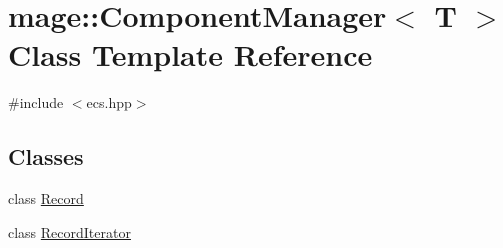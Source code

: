 \hypertarget{classmage_1_1_component_manager}{}\section{mage\+:\+:Component\+Manager$<$ T $>$ Class Template Reference}
\label{classmage_1_1_component_manager}


{\ttfamily \#include $<$ecs.\+hpp$>$}

\subsection*{Classes}
\begin{DoxyCompactItemize}
\item 
class \mbox{\hyperlink{classmage_1_1_component_manager_1_1_record}{Record}}
\item 
class \mbox{\hyperlink{classmage_1_1_component_manager_1_1_record_iterator}{Record\+Iterator}}
\end{DoxyCompactItemize}
